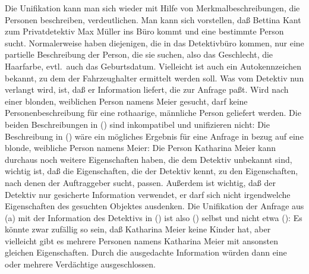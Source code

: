 Die Unifikation kann man sich wieder mit Hilfe von Merkmalbeschreibungen, die Personen beschreiben, verdeutlichen.
Man kann sich vorstellen, daß Bettina Kant zum Privatdetektiv Max Müller ins Büro kommt und eine
bestimmte Person sucht. Normalerweise haben diejenigen, die in das Detektivbüro kommen, nur eine
partielle Beschreibung der Person, die sie suchen, also \zb das Geschlecht, die Haarfarbe, evtl.\
auch das Geburtsdatum. Vielleicht ist auch ein Autokennzeichen bekannt, zu dem der Fahrzeughalter
ermittelt werden soll.
Was vom Detektiv nun verlangt wird, ist, daß er Information liefert, die zur Anfrage paßt. Wird
nach einer blonden, weiblichen Person namens Meier gesucht, darf keine Personenbeschreibung für eine rothaarige,
männliche Person geliefert werden. Die beiden Beschreibungen in (\mex{1}) sind inkompatibel und unifizieren nicht:
\eal
\ex {}
\ex {}
\zl
Die Beschreibung in () wäre ein mögliches Ergebnis für eine Anfrage in bezug auf eine blonde, weibliche Person namens Meier:
\ea
{}
\z
Die Person Katharina Meier kann durchaus noch weitere Eigenschaften haben, die dem Detektiv unbekannt sind,
wichtig ist, daß die Eigenschaften, die der Detektiv kennt, zu den Eigenschaften, nach denen der Auftraggeber sucht,
passen. Außerdem ist wichtig, daß der Detektiv nur gesicherte Information verwendet, er darf sich nicht irgendwelche
Eigenschaften des gesuchten Objektes ausdenken. Die Unifikation der Anfrage aus (\mex{-1}a) mit der Information
des Detektivs in (\mex{0}) ist also (\mex{0}) selbst und nicht etwa (\mex{1}):
\ea
{}
\z
Es könnte zwar zufällig so sein, daß Katharina Meier keine Kinder hat, 
aber vielleicht gibt es mehrere Personen
namens Katharina Meier mit ansonsten gleichen Eigenschaften. 
Durch die ausgedachte Information würden dann eine oder mehrere Verdächtige ausgeschlossen.

